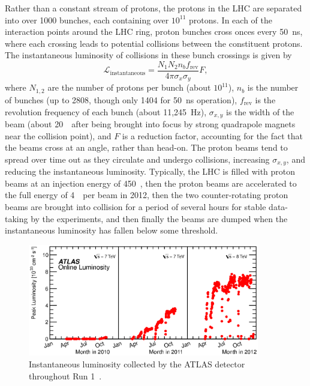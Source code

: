 Rather than a constant stream of protons, the protons in the LHC are separated
into over 1000 bunches, each containing over $10^{11}$ protons.
In each of the interaction points around the LHC ring, proton bunches cross
onces every 50~ns, where each crossing leads to potential collisions between
the constituent protons.
The instantaneous luminosity of collisions in these bunch crossings is given by
\begin{equation}
  \mathcal{L}_\mathrm{instantaneous} =
  \frac{N_{1}N_{2} n_b f_\mathrm{rev}}
  {4\pi \sigma_{x} \sigma_{y}}
  F,
\end{equation}
where $N_{1,2}$ are the number of protons per bunch (about $10^{11}$),
$n_b$ is the number of bunches (up to 2808, though only 1404 for
50~ns operation), $f_\mathrm{rev}$ is the revolution frequency of each
bunch (about 11,245~Hz),
$\sigma_{x,y}$ is the width of the beam (about 20~\um\ after being brought
into focus by strong quadrapole magnets near the collision point),
and $F$ is a reduction factor, accounting for the fact that the beams cross
at an angle, rather than head-on.
The proton beams tend to spread over time out as they circulate and undergo
collisions, increasing $\sigma_{x,y}$, and reducing the instantaneous
luminosity.
Typically, the LHC is filled with proton beams at an injection energy of
450~\GeV, then the proton beams are accelerated to the full energy of
4~\TeV\ per beam in 2012, then the two counter-rotating proton beams are
brought into collision for a period of several hours for stable data-taking by
the experiments, and then finally the beams are dumped when the instantaneous
luminosity has fallen below some threshold.

\begin{figure}[t!]
  \centering
  \includegraphics[width=0.9\textwidth]{figs/lhc/lumivstime.eps}
  \caption{
    Instantaneous luminosity collected by the ATLAS detector throughout
    Run 1~\cite{atlas-lumi}.
  }
  \label{fig:inst_lumi_vs_time}
\end{figure}

